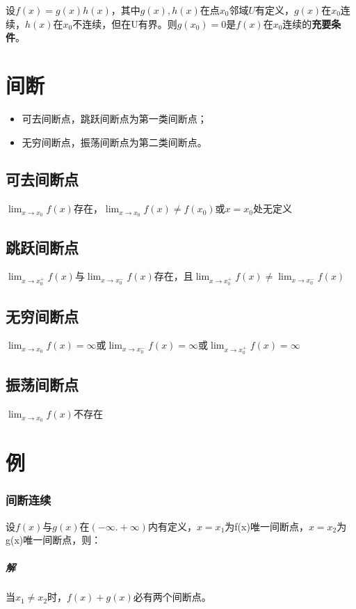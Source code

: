 设\(f(x) = g(x)h(x)\)，其中\(g(x), h(x)\)在点\(x_0\)邻域\(U\)有定义，\(g(x)\)在\(x_0\)连续，\(h(x)\)在\(x_0\)不连续，但在U有界。则\(g(x_0) = 0\)是\(f(x)\)在\(x_0\)连续的\textbf{充要条件}。


\section{间断}
\begin{itemize}
    \item 可去间断点，跳跃间断点为第一类间断点；
    \item 无穷间断点，振荡间断点为第二类间断点。
\end{itemize}

\subsection{可去间断点}
\(\displaystyle \lim_{x \to x_0}f(x)\)存在，\(\displaystyle \lim_{x \to x_0}f(x) \neq f(x_0)\)或\(x = x_0\)处无定义

\subsection{跳跃间断点}
\(\displaystyle \lim_{x \to x_0^+}f(x)\)与\(\displaystyle \lim_{x \to x_0^-}f(x)\)存在，且\(\displaystyle \lim_{x \to x_0^+}f(x) \neq \displaystyle \lim_{x \to x_0^-}f(x)\)

\subsection{无穷间断点}
\(\displaystyle \lim_{x \to x_0}f(x) = \infty\)或\(\displaystyle \lim_{x \to x_0^-}f(x) = \infty\)或\(\displaystyle \lim_{x \to x_0^+}f(x) = \infty\)

\subsection{振荡间断点}
\(\displaystyle \lim_{x \to x_0}f(x)\)不存在


\section{例}

\subsubsection{间断连续}
设\(f(x)\)与\(g(x)\)在\((-\infty. +\infty)\)内有定义，\(x = x_1\)为f(x)唯一间断点，\(x = x_2\)为g(x)唯一间断点，则：
\subparagraph{解}
当\(x_1 \neq x_2\)时，\(f(x) + g(x)\)必有两个间断点。

